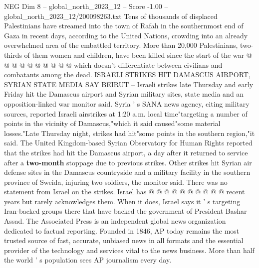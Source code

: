 \begin{textsample}{NEG Dim 8 – global\_north\_2023\_12 – Score -1.00 – global\_north\_2023\_12/200098263.txt}
Tens of thousands of displaced Palestinians have streamed into the town of Rafah in the southernmost end of Gaza in recent days, according to the United Nations, crowding into an already overwhelmed area of the embattled territory.
More than 20,000 Palestinians, two-thirds of them women and children, have been killed since the start of the war @ @ @ @ @ @ @ @ @ @ which doesn't differentiate between civilians and combatants among the dead.
ISRAELI STRIKES HIT DAMASCUS AIRPORT, SYRIAN STATE MEDIA SAY BEIRUT -- Israeli strikes late Thursday and early Friday hit the Damascus airport and Syrian military sites, state media and an opposition-linked war monitor said.
Syria ' s SANA news agency, citing military sources, reported Israeli airstrikes at 1:20 a.m. local time"targeting a number of points in the vicinity of Damascus,"which it said caused"some material losses."Late Thursday night, strikes had hit"some points in the southern region,"it said.
The United Kingdom-based Syrian Observatory for Human Rights reported that the strikes had hit the Damascus airport, a day after it returned to service after a \textbf{two-month} stoppage due to previous strikes.
Other strikes hit Syrian air defense sites in the Damascus countryside and a military facility in the southern province of Sweida, injuring two soldiers, the monitor said.
There was no statement from Israel on the strikes.
Israel has @ @ @ @ @ @ @ @ @ @ recent years but rarely acknowledges them.
When it does, Israel says it ' s targeting Iran-backed groups there that have backed the government of President Bashar Assad.
The Associated Press is an independent global news organization dedicated to factual reporting.
Founded in 1846, AP today remains the most trusted source of fast, accurate, unbiased news in all formats and the essential provider of the technology and services vital to the news business.
More than half the world ' s population sees AP journalism every day.

\end{textsample}
